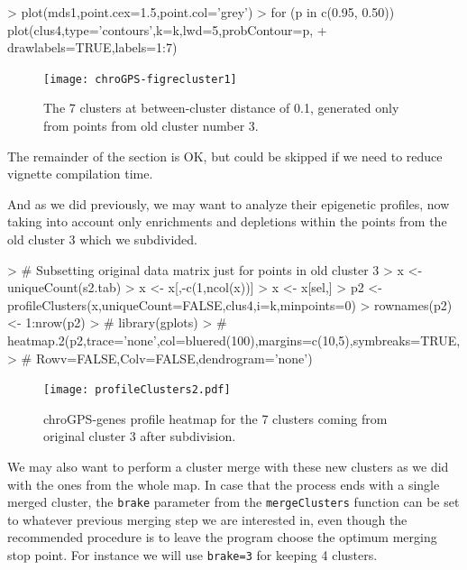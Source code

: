 \documentclass[a4paper,12pt,nogin]{article}
\newcommand{\drcomment}[1]{{\color{red} #1}} %
\begin{document}
\footnotesize

\begin{Schunk}
\begin{Sinput}
> plot(mds1,point.cex=1.5,point.col='grey')
> for (p in c(0.95, 0.50)) plot(clus4,type='contours',k=k,lwd=5,probContour=p,
+ drawlabels=TRUE,labels=1:7)
\end{Sinput}
\end{Schunk}

\normalsize

\begin{figure}
\begin{center}
\texttt{[image: chroGPS-figrecluster1]}
\end{center}
\caption{The 7 clusters at between-cluster distance of 0.1, generated only from points from old cluster number 3.}
\label{fig:recluster1}
\end{figure}

\drcomment{The remainder of the section is OK, but could be skipped if we need to reduce vignette compilation time.}

And as we did previously, we may want to analyze their epigenetic profiles, now taking into account only enrichments and depletions within the points from the old cluster 3 which we subdivided.

\footnotesize

\begin{Schunk}
\begin{Sinput}
> # Subsetting original data matrix just for points in old cluster 3
> x <- uniqueCount(s2.tab)
> x <- x[,-c(1,ncol(x))]
> x <- x[sel,]
> p2 <- profileClusters(x,uniqueCount=FALSE,clus4,i=k,minpoints=0)
> rownames(p2) <- 1:nrow(p2)
> # library(gplots)
> # heatmap.2(p2,trace='none',col=bluered(100),margins=c(10,5),symbreaks=TRUE,
> # Rowv=FALSE,Colv=FALSE,dendrogram='none')
\end{Sinput}
\end{Schunk}

\normalsize

\begin{figure}
\begin{center}
{\texttt{[image: profileClusters2.pdf]}}
\end{center}
\caption{chroGPS-genes profile heatmap for the 7 clusters coming from original cluster 3
  after subdivision.}
\label{fig:profile2}
\end{figure}

We may also want to perform a cluster merge with these new clusters as we did with the ones from the whole map. In case that the process ends with a single merged cluster, the \texttt{brake} parameter from the \texttt{mergeClusters} function can be set to whatever previous merging step we are interested in, even though the recommended procedure is to leave the program choose the optimum merging stop point. For instance we will use \texttt{brake=3} for keeping 4 clusters.
\end{document}
